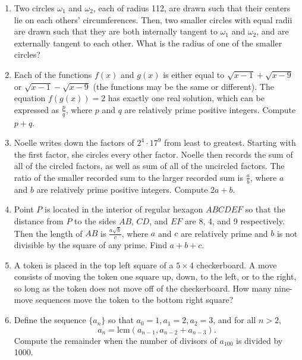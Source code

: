 \documentclass{article}
\begin{document}

\begin{enumerate} 

\item Two circles $\omega_1$ and $\omega_2$, each of radius 112, are drawn such that their centers lie on each others’ circumferences. Then, two smaller circles with equal radii are drawn such that they are both internally tangent to $\omega_1$ and $\omega_2$, and are externally tangent to each other. What is the radius of one of the smaller circles?

\item Each of the functions $f(x)$ and $g(x)$ is either equal to $\sqrt{x-1}+\sqrt{x-9}$ or $\sqrt{x-1}-\sqrt{x-9}$ (the functions may be the same or different). The equation $f(g(x))=2$ has exactly one real solution, which can be expressed as $\frac{p}{q}$, where $p$ and $q$ are relatively prime positive integers. Compute $p+q$.

\item Noelle writes down the factors of $2^4 \cdot 17^9$ from least to greatest. Starting with the first factor, she circles every other factor. Noelle then records the sum of all of the circled factors, as well as sum of all of the uncircled factors. The ratio of the smaller recorded sum to the larger recorded sum is $\frac{a}{b}$, where $a$ and $b$ are relatively prime positive integers. Compute $2a+b$.

\item Point $P$ is located in the interior of regular hexagon $ABCDEF$ so that the distance from $P$ to the sides $AB$, $CD$, and $EF$ are 8, 4, and 9 respectively. Then the length of $AB$ is $\frac{a\sqrt{b}}{c}$, where $a$ and $c$ are relatively prime and $b$ is not divisible by the square of any prime. Find $a+b+c$.

\item A token is placed in the top left square of a $5 \times 4$ checkerboard. A move consists of moving the token one square up, down, to the left, or to the right, so long as the token does not move off of the checkerboard. How many nine-move sequences move the token to the bottom right square?

\item Define the sequence $\{ a_n \}$ so that $a_0=1, a_1=2, a_2=3$, and for all $n>2$, \[ a_n= \mathrm{lcm}(a_{n-1},a_{n-2}+a_{n-3}). \]
Compute the remainder when the number of divisors of $a_{100}$ is divided by 1000.


\end{enumerate}
\end{document}
